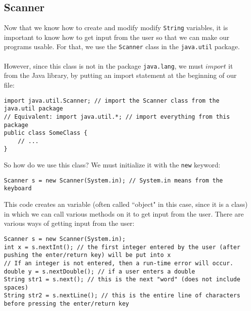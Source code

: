 \subsection{Scanner}
Now that we know how to create and modify modify \verb|String| variables, it is important to know how to get input from the user so that we can make our programs usable. For that, we use the \verb|Scanner| class in the \verb|java.util| package.
\\ \\
However, since this class is not in the package \verb|java.lang|, we must $import$ it from the Java library, by putting an import statement at the beginning of our file:
\begin{lstlisting}
import java.util.Scanner; // import the Scanner class from the java.util package
// Equivalent: import java.util.*; // import everything from this package
public class SomeClass {
	// ...
}
\end{lstlisting}

\noindent So how do we use this class? We must initialize it with the \verb|new| keyword:
\begin{lstlisting}
Scanner s = new Scanner(System.in); // System.in means from the keyboard
\end{lstlisting}
\noindent This code creates an variable (often called ``object" in this case, since it is a class) in which we can call various methods on it to get input from the user. There are various ways of getting input from the user:

\begin{lstlisting}
Scanner s = new Scanner(System.in);
int x = s.nextInt(); // the first integer entered by the user (after pushing the enter/return key) will be put into x
// If an integer is not entered, then a run-time error will occur.
double y = s.nextDouble(); // if a user enters a double
String str1 = s.next(); // this is the next "word" (does not include spaces)
String str2 = s.nextLine(); // this is the entire line of characters before pressing the enter/return key
\end{lstlisting}

